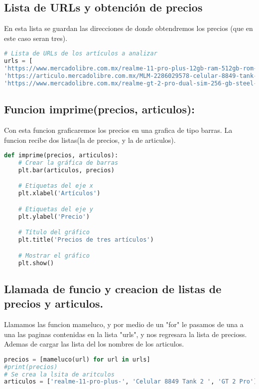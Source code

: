 \documentclass[12pt]{article}
\begin{document}
\subsection{Lista de URLs y obtención de precios}
	En esta lista se guardan las direcciones de donde obtendremos los precios (que en este caso seran tres).
	\begin{lstlisting}[language=Python]
# Lista de URLs de los artículos a analizar
urls = [
'https://www.mercadolibre.com.mx/realme-11-pro-plus-12gb-ram-512gb-rom-200mp-ois-dual-sim-verde-5000-mah-100w-pantalla-curva-120hz-fhd/p/MLM23438802?pdp_filters=item_id:MLM1922556715#is_advertising=true&searchVariation=MLM23438802&position=1&search_layout=stack&type=pad&tracking_id=97805d59-1549-48d8-a60a-8b8beea8d935&is_advertising=true&ad_domain=VQCATCORE_LST&ad_position=1&ad_click_id=ZjZjY2ZlZWEtY2YwNi00YWI0LWJkZWItMDE3OWQwNWIyOTY3',
'https://articulo.mercadolibre.com.mx/MLM-2286029578-celular-8849-tank-2-de-12gb-256gb-155000mah-con-proyector-_JM#polycard_client=bookmarks',
'https://www.mercadolibre.com.mx/realme-gt-2-pro-dual-sim-256-gb-steel-black-12-gb-ram/p/MLM19130693?pdp_filters=item_id:MLM1507221033#is_advertising=true&searchVariation=MLM19130693&position=9&search_layout=stack&type=pad&tracking_id=d7676704-bae0-4c80-8d25-29fa31f1b171&is_advertising=true&ad_domain=V
	\end{lstlisting}
	
	\subsection{Funcion imprime(precios, articulos):}
	Con esta funcion graficaremos los precios en una grafica de tipo barras. La funcion recibe dos listas(la de precios, y la de articulos).  
	\begin{lstlisting}[language=Python]
def imprime(precios, articulos):
	# Crear la gráfica de barras
	plt.bar(articulos, precios)

	# Etiquetas del eje x
	plt.xlabel('Artículos')

	# Etiquetas del eje y
	plt.ylabel('Precio')

	# Título del gráfico
	plt.title('Precios de tres artículos')

	# Mostrar el gráfico
	plt.show()		
	\end{lstlisting}
\subsection{Llamada de funcio y creacion de listas de precios y articulos.}
Llamamos las funcion mameluco, y por medio de un "for" le pasamos de una a una las paginas contenidas en la lista "urls", y nos regresara la lista de precioss. Ademas de cargar las lista del los nombres de los articulos.
\begin{lstlisting}[language=Python]
precios = [mameluco(url) for url in urls]
#print(precios)
# Se crea la lsita de aritculos
articulos = ['realme-11-pro-plus-', 'Celular 8849 Tank 2 ', 'GT 2 Pro']
\end{lstlisting}
\end{document}
